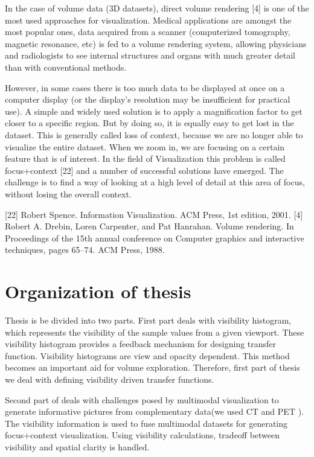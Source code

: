 In the case of volume data (3D datasets), direct volume rendering [4] is one of the most used approaches for visualization. Medical applications are amongst the most popular ones, data acquired from a scanner (computerized tomography, magnetic resonance, etc) is fed to a volume rendering system, allowing physicians and radiologists to see internal structures and organs with much greater detail than with conventional methods.

However, in some cases there is too much data to be displayed at once on a computer display (or the display’s resolution may be insufficient for practical use). A simple and widely used solution is to apply a magnification factor to get closer to a specific region. But by doing so, it is equally easy to get lost in the dataset. This is generally called loss of context, because we are no longer able to visualize the entire dataset. When we zoom in, we are focusing on a certain feature that is of interest. In the field of Visualization this problem is called focus+context [22] and a number of successful solutions have emerged. The challenge is to find a way of looking at a high level of detail at this area of focus, without losing the overall context.

[22] Robert Spence. Information Visualization. ACM Press, 1st edition, 2001.
[4] Robert A. Drebin, Loren Carpenter, and Pat Hanrahan. Volume rendering. In Proceedings of the 15th annual conference on Computer graphics and interactive techniques, pages 65–74. ACM Press, 1988.

\section{Organization of thesis}
Thesis is be divided into two parts. First part deals with visibility histogram, which represents the visibility of the sample values from a given viewport. These visibility histogram provides a feedback mechanism for designing transfer function. Visibility histograms are view and opacity dependent. This method becomes an important aid for volume exploration.
Therefore, first part of thesis we deal with defining visibility driven transfer functions. 

Second part of deals with challenges posed by multimodal visualization to generate informative pictures from complementary data(we used CT and PET ). The visibility information is used to fuse multimodal datasets for generating focus+context visualization.
Using visibility calculations, tradeoff between visibility and spatial clarity is handled. 

